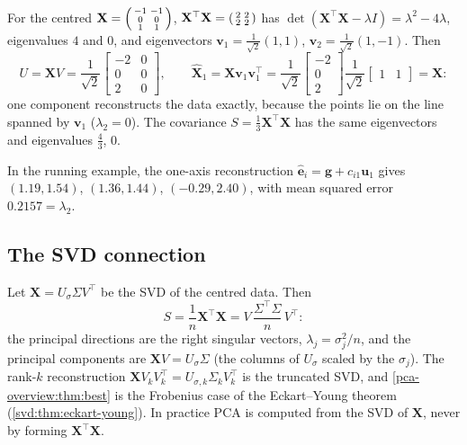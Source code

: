 \begin{notechapter}
\begin{example}\label{pca-overview:ex:line}
For the centred $\mathbf X = \begin{psmallmatrix}-1&-1\\0&0\\1&1\end{psmallmatrix}$,
$\mathbf X^\top\mathbf X = \begin{psmallmatrix}2&2\\2&2\end{psmallmatrix}$ has $\det(\mathbf X^\top\mathbf X - \lambda I) = \lambda^2 - 4\lambda$,
eigenvalues $4$ and $0$, and eigenvectors $\mathbf v_1 = \frac1{\sqrt2}(1,1)$, $\mathbf v_2 = \frac1{\sqrt2}(1,-1)$. Then
\[
  U = \mathbf XV = \frac1{\sqrt2}\begin{bmatrix}-2&0\\0&0\\2&0\end{bmatrix},\qquad
  \hat{\mathbf X}_1 = \mathbf X\mathbf v_1\mathbf v_1^\top = \frac1{\sqrt2}\begin{bmatrix}-2\\0\\2\end{bmatrix}\frac1{\sqrt2}\begin{bmatrix}1&1\end{bmatrix} = \mathbf X:
\]
one component reconstructs the data exactly, because the points lie on the line spanned by
$\mathbf v_1$ ($\lambda_2 = 0$). The covariance $S = \frac13\mathbf X^\top\mathbf X$ has the same eigenvectors and
eigenvalues $\frac43$, $0$.
\end{example}

In the running example, the one-axis reconstruction
$\hat{\mathbf e}_i = \mathbf g + c_{i1}\mathbf u_1$ gives $(1.19, 1.54)$, $(1.36, 1.44)$, $(-0.29, 2.40)$, with mean squared
error $0.2157 = \lambda_2$.

\subsection{The SVD connection}

Let $\mathbf X = U_\sigma\Sigma V^\top$ be the SVD of the centred data. Then
\[
  S = \frac1n\mathbf X^\top\mathbf X = V\,\frac{\Sigma^\top\Sigma}{n}\,V^\top :
\]
the principal directions are the right singular vectors, $\lambda_j = \sigma_j^2/n$, and the principal
components are $\mathbf XV = U_\sigma\Sigma$ (the columns of $U_\sigma$ scaled by the $\sigma_j$). The rank-$k$
reconstruction $\mathbf XV_kV_k^\top = U_{\sigma,k}\Sigma_kV_k^\top$ is the truncated SVD, and
\cref{pca-overview:thm:best} is the Frobenius case of the Eckart--Young theorem
(\cref{svd:thm:eckart-young}). In practice PCA is computed from the SVD of $\mathbf X$, never by
forming $\mathbf X^\top\mathbf X$.


\end{notechapter}
